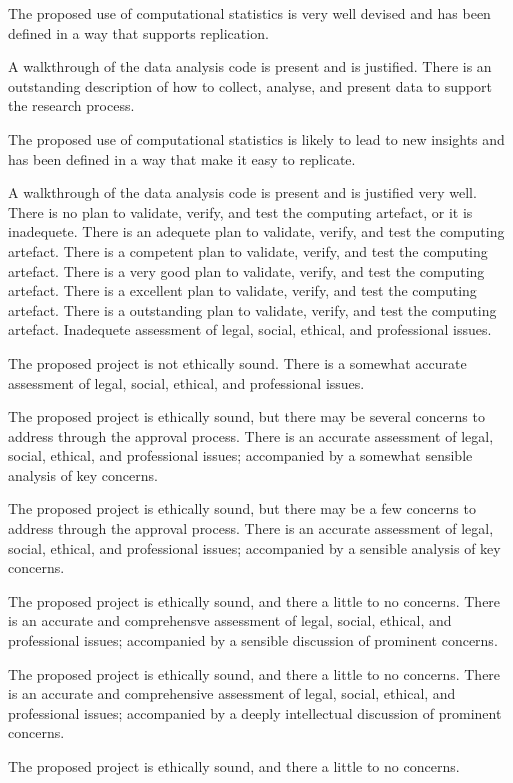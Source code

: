 \begin{markingrubric}
         \par		The proposed use of computational statistics is very well devised and has been defined in a way that supports replication.      
        \par		A walkthrough of the data analysis code is present and is justified.   
        \grade 		There is an outstanding description of how to collect, analyse, and present data to support the research process.
         \par		The proposed use of computational statistics is likely to lead to new insights and has been defined in a way that make it easy to replicate.        
        \par		A walkthrough of the data analysis code is present and is justified very well. 
        \grade\fail 	There is no plan to validate, verify, and test the computing artefact, or it is inadequete.
        \grade 		There is an adequete plan to validate, verify, and test the computing artefact.
        \grade 		There is a competent plan to validate, verify, and test the computing artefact.
        \grade 		There is a very good plan to validate, verify, and test the computing artefact.
        \grade 		There is a excellent plan to validate, verify, and test the computing artefact.
        \grade 		There is a outstanding plan to validate, verify, and test the computing artefact.    
        \grade\fail 	Inadequete assessment of legal, social, ethical, and professional issues.
         \par		The proposed project is not ethically sound.
        \grade 		There is a somewhat accurate assessment of legal, social, ethical, and professional issues.
        \par		The proposed project is ethically sound, but there may be several concerns to address through the approval process.
        \grade 		There is an accurate assessment of legal, social, ethical, and professional issues; accompanied by a somewhat sensible analysis of key concerns.
        \par		The proposed project is ethically sound, but there may be a few concerns to address through the approval process.
        \grade 		There is an accurate assessment of legal, social, ethical, and professional issues; accompanied by a sensible analysis of key concerns.
        \par		The proposed project is ethically sound, and there a little to no concerns.
        \grade 		There is an accurate and comprehensve assessment of legal, social, ethical, and professional issues; accompanied by a sensible discussion of prominent concerns.
        \par		The proposed project is ethically sound, and there a little to no concerns.
        \grade 		There is an accurate and comprehensive assessment of legal, social, ethical, and professional issues; accompanied by a deeply intellectual discussion of prominent concerns.
        \par		The proposed project is ethically sound, and there a little to no concerns.
%
\end{markingrubric}
	

